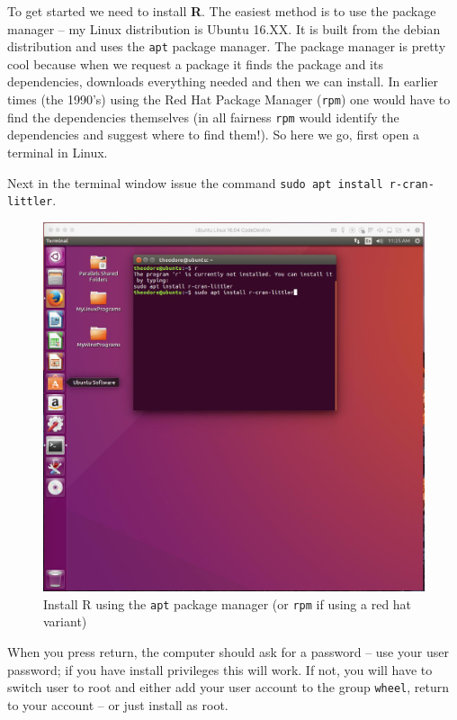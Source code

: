 To get started we need to install \textbf{R}.  
The easiest method is to use the package manager -- my Linux distribution is Ubuntu 16.XX.  
It is built from the debian distribution and uses the \texttt{apt} package manager.
The package manager is pretty cool because when we request a package it finds the package and its dependencies, downloads everything needed and then we can install.
In earlier times (the 1990's) using the Red Hat Package Manager (\texttt{rpm}) one would have to find the dependencies themselves (in all fairness \texttt{rpm} would identify the dependencies and suggest where to find them!).  So here we go, first open a terminal in Linux.

Next in the terminal window issue the command \texttt{sudo apt install r-cran-littler}.

\begin{figure}[h!] %
   \centering
   \includegraphics[width=4.5in]{./1-Introduction/LinuxInstallR.jpg} 
   \caption{Install R using the \texttt{apt} package manager (or \texttt{rpm} if using a red hat variant)}
\end{figure}

When you press return, the computer should ask for a password -- use your user password; if you have install privileges this will work.  
If not, you will have to switch user to root and either add your user account to the group \texttt{wheel}, return to your account -- or just install as root.


